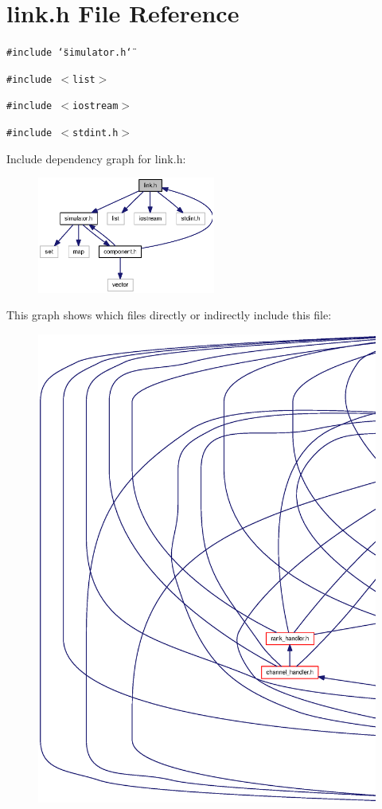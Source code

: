 \section{link.h File Reference}
\label{link_8h}
{\tt \#include \char`\"{}simulator.h\char`\"{}}\par
{\tt \#include $<$list$>$}\par
{\tt \#include $<$iostream$>$}\par
{\tt \#include $<$stdint.h$>$}\par


Include dependency graph for link.h:\nopagebreak
\begin{figure}[H]
\begin{center}
\leavevmode
\includegraphics[width=166pt]{link_8h__incl}
\end{center}
\end{figure}


This graph shows which files directly or indirectly include this file:\nopagebreak
\begin{figure}[H]
\begin{center}
\leavevmode
\includegraphics[width=420pt]{link_8h__dep__incl}
\end{center}
\end{figure}
